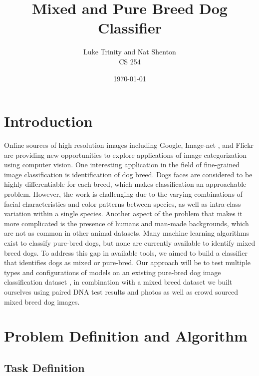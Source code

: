 \documentclass[12pt]{article}
\title{Mixed and Pure Breed Dog Classifier}
\date{\today}
\author{Luke Trinity and Nat Shenton \\ CS 254}
\begin{document}
 
\maketitle
\section{Introduction}

Online sources of high resolution images including Google, Image-net \cite{deng2009imagenet}, and Flickr are providing new opportunities to explore applications of image categorization using computer vision. One interesting application in the field of fine-grained image classification is identification of dog breed. Dogs faces are considered to be highly differentiable for each breed, which makes classification an approachable problem. However, the work is challenging due to the varying combinations of facial characteristics and color patterns between species, as well as intra-class variation within a single species. Another aspect of the problem that makes it more complicated is the presence of humans and man-made backgrounds, which are not as common in other animal datasets. Many machine learning algorithms exist to classify pure-bred dogs, but none are currently available to identify mixed breed dogs. To address this gap in available tools, we aimed to build a classifier that identifies dogs as mixed or pure-bred. Our approach will be to test multiple types and configurations of models on an existing pure-bred dog image classification dataset \cite{khosla2011novel}, in combination with a mixed breed dataset we built ourselves using paired DNA test results and photos \cite{voith2009comparison} as well as crowd sourced mixed breed dog images. 

\section{Problem Definition and Algorithm}

\subsection{Task Definition}
\end{document}
